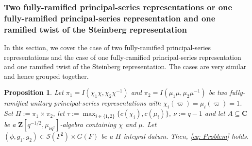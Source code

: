 \documentclass{amsart}
\theoremstyle{plain}
\newtheorem{prop}[thm]{Proposition}
\theoremstyle{plain}
\theoremstyle{remark}
\begin{document}
\subsubsection{Two fully-ramified principal-series representations or one fully-ramified principal-series representation and one ramified twist of the Steinberg representation}

In this section, we cover the case of two fully-ramified principal-series representations and the case of one fully-ramified principal-series representation and one ramified twist of the Steinberg representation. The cases are very similar and hence grouped together.
\begin{prop}\label{thm 2 full-ram p-s}
    Let $\pi_1=I(\chi_1\chi,\chi_2\chi^{-1})$ and $\pi_2=I(\mu_1\mu,\mu_2\mu^{-1})$ be two fully-ramified unitary principal-series representations with $\chi_i(\varpi)=\mu_i(\varpi)=1$. Set $\Pi:=\pi_1\times \pi_2$, let $\tau:=\max_{i\in\{1,2\}}\{c(\chi_i),c(\mu_i)\}$, $\nu:=q-1$ and let $A\subseteq\mathbf{C}$ be a $\mathbf{Z}[q^{-1/2},\mu_{\nu q^\tau}]$-algebra containing $\chi$ and $\mu$. Let $(\phi,g_1,g_2)\in\mathcal{S}(F^2)\times G(F)$ be a $\Pi$-integral datum. Then, \eqref{eq: Problem} holds.
\end{prop}
\end{document}
